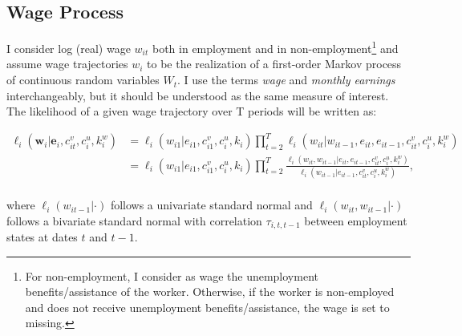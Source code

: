 \documentclass[12pt, a4paper]{article}
\let\Oldsubsection\subsection
\renewcommand{\subsection}{\FloatBarrier\Oldsubsection}
\begin{document}
\subsection{Wage Process}\label{Sec:income_process}


I consider log (real) wage $w_{it}$ both in employment and in non-employment\footnote{For non-employment, I consider as wage the unemployment benefits/assistance of the worker. Otherwise, if the worker is non-employed and does not receive unemployment benefits/assistance, the wage is set to missing.} and assume wage trajectories $w_i$ to be the realization of a first-order Markov process  of continuous random variables $W_t$. I use the terms \emph{wage} and \emph{monthly earnings} interchangeably, but it should be understood as the same measure of interest. The likelihood of a given wage trajectory over T periods will be written as:


\begin{align}\label{eq:Likelihood_wages}
\ell_{i}(\textbf{w}_i|\textbf{e}_i,c_{it}^v,c_i^u,k^w_i) & =  \ell_{i}(w_{i1}|e_{i1},c_{i1}^v,c_i^u,k_i) \prod_{t=2}^{T} \ell_{i}(w_{it}|w_{it-1},e_{it},e_{it-1},c_{it}^v,c_i^u,k^w_i) \\ \nonumber
& = \ell_{i}(w_{i1}|e_{i1},c_{i1}^v,c_i^u,k_i) \prod_{t=2}^{T} \frac{\ell_{i}(w_{it},w_{it-1}|e_{it},e_{it-1},c_{it}^v,c_i^u,k^w_i)}{\ell_{i}(w_{it-1}|e_{it-1},c_{it}^v,c_i^u,k^w_i)} , \\ \nonumber
\end{align}

where $\ell_{i}(w_{it-1}|\cdot)$ follows a univariate standard normal and $\ell_{i}(w_{it},w_{it-1}|\cdot)$ follows a bivariate standard normal with correlation $\tau_{i,t,t-1}$ between employment states at dates $t$ and $t-1$.

\end{document}
